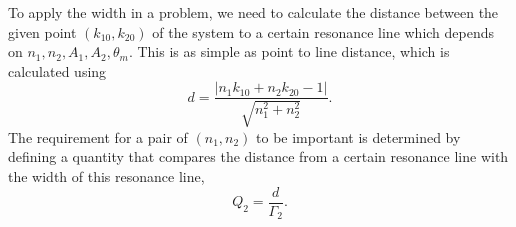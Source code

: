 











To apply the width in a problem, we need to calculate the distance between the given point $(k_{10},k_{20})$ of the system to a certain resonance line which depends on $n_1,n_2,A_1,A_2,\theta_m$. This is as simple as point to line distance, which is calculated using
\begin{equation}
   d = \frac{\lvert n_1 k_{10} + n_2 k_{20} - 1 \rvert}{\sqrt{n_1^2 + n_2^2} }.
   \label{stimulated-2-freq-distance-0}
\end{equation}
The requirement for a pair of $(n_1,n_2)$ to be important is determined by defining a quantity that compares the distance from a certain resonance line with the width of this resonance line,
\begin{equation}
   Q_2 = \frac{d}{\Gamma_2}. 
\end{equation}
   




